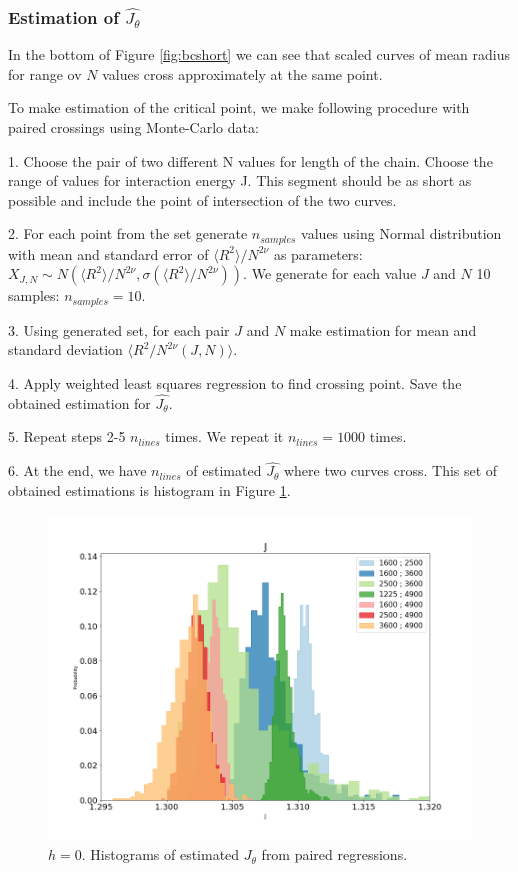 \subsubsection{ Estimation of $\hat{J_{\theta}}$}

In the bottom of Figure \ref{fig:bcshort} we can see that scaled curves of mean radius for range ov $N$ values cross approximately at the same point. %

 To make estimation of the critical point, we make following procedure with paired crossings using Monte-Carlo data: 

1. Choose the pair of two different N values for length of the chain. Choose the range of values for interaction energy J. This segment should be as short as possible and include the point of intersection of the two curves. 

2. For each point from the set generate $n_{samples}$ values using Normal distribution with mean and standard error of $\langle R^2 \rangle / N^ {2 \nu}$ as parameters: $ X_{J, N} \sim N (\langle R^2 \rangle / N^ {2 \nu}, \sigma (\langle R^2 \rangle / N^ {2 \nu}))$. We generate for each value $J$ and $N$ 10 samples: $n_{samples} = 10$. 

3. Using generated set, for each pair $J$ and $N$ make estimation for mean and standard deviation $\langle  R^2 / N^ {2 \nu} (J, N)\rangle$.

4. Apply weighted least squares regression to find crossing point. Save the obtained estimation for $\hat{J_{\theta}}$. 

5. Repeat steps 2-5 $n_{lines}$ times. We repeat it $n_{lines}=1000$ times. 

6. At the end, we have $n_{lines}$ of estimated $\hat{J_{\theta}}$ where two curves cross. This set of obtained estimations is histogram in Figure \ref{fig:Jthetahistogram}. 

 \begin{figure}
	\centering
	\includegraphics[scale=0.28]{Images/radius_hist_cov.png}
	\caption{$h=0$. Histograms of estimated $J_{\theta}$ from paired regressions.  }
	\label{fig:Jthetahistogram}
\end{figure}


